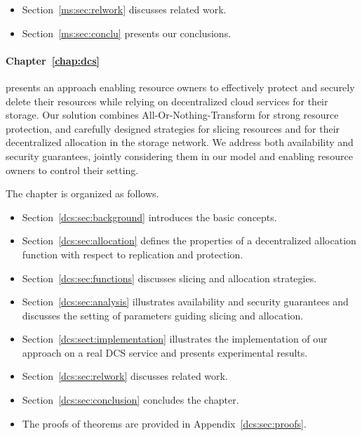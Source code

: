 {\begin{itemize}
	\item Section~\ref{ms:sec:relwork} discusses related work. 
	
	\item Section~\ref{ms:sec:conclu} presents our conclusions.
\end{itemize}

\medskip

\paragraph*{Chapter~\ref{chap:dcs}}
presents an approach enabling resource owners to effectively protect and securely delete their resources while relying on decentralized cloud services for their storage.
Our solution combines All-Or-Nothing-Transform for strong resource protection, and carefully designed strategies for slicing resources and for their decentralized allocation in the storage network.  We address both availability and security guarantees, jointly considering them in our model and enabling resource owners to control their setting.

\smallskip

The chapter is organized as follows.

\begin{itemize}
\item Section~\ref{dcs:sec:background} introduces the basic concepts.
\item Section~\ref{dcs:sec:allocation} defines the properties of a decentralized allocation function with respect to replication and protection.
\item Section~\ref{dcs:sec:functions} discusses slicing and allocation strategies.
\item Section~\ref{dcs:sec:analysis} illustrates availability and security guarantees and discusses the setting of parameters guiding slicing and allocation.
\item Section~\ref{dcs:sect:implementation} illustrates the implementation of our approach on a real DCS service and presents experimental results.
\item Section~\ref{dcs:sec:relwork} discusses related work.
\item Section~\ref{dcs:sec:conclusion} concludes the chapter. 
\item The proofs of theorems are provided in Appendix~\ref{dcs:sec:proofs}.
\end{itemize}

\medskip

}
